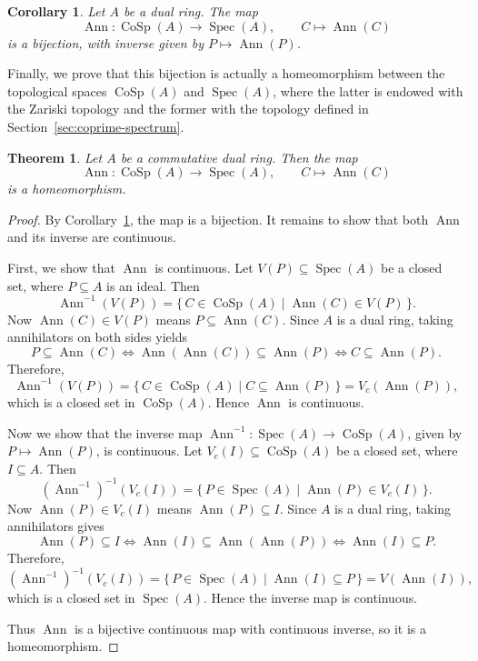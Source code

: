 \documentclass{amsart}
\newtheorem{theorem}{Theorem}
\newtheorem{corollary}{Corollary}
\DeclareMathOperator{\ann}{Ann}
\begin{document}
\begin{corollary}\label{cor:dual-coprime-prime-bijection}
Let $A$ be a dual ring. The map
\[
\ann\colon \operatorname{CoSp}(A) \longrightarrow \operatorname{Spec}(A), \qquad C \longmapsto \ann(C)
\]
is a bijection, with inverse given by $P \mapsto \ann(P)$.
\end{corollary}

Finally, we prove that this bijection is actually a homeomorphism between the topological spaces $\operatorname{CoSp}(A)$ and $\operatorname{Spec}(A)$, where the latter is endowed with the Zariski topology and the former with the topology defined in Section~\ref{sec:coprime-spectrum}.

\begin{theorem}\label{thm:dual-homeomorphism}
Let $A$ be a commutative dual ring. Then the map
\[
\ann\colon \operatorname{CoSp}(A) \longrightarrow \operatorname{Spec}(A), \qquad C \longmapsto \ann(C)
\]
is a homeomorphism.
\end{theorem}

\begin{proof}
By Corollary~\ref{cor:dual-coprime-prime-bijection}, the map is a bijection. It remains to show that both $\ann$ and its inverse are continuous.

First, we show that $\ann$ is continuous. Let $V(P) \subseteq \operatorname{Spec}(A)$ be a closed set, where $P \subseteq A$ is an ideal. Then
\[
\ann^{-1}(V(P)) = \{\, C \in \operatorname{CoSp}(A) \mid \ann(C) \in V(P) \,\}.
\]
Now $\ann(C) \in V(P)$ means $P \subseteq \ann(C)$. Since $A$ is a dual ring, taking annihilators on both sides yields
\[
P \subseteq \ann(C) \iff \ann(\ann(C)) \subseteq \ann(P) \iff C \subseteq \ann(P).
\]
Therefore,
\[
\ann^{-1}(V(P)) = \{\, C \in \operatorname{CoSp}(A) \mid C \subseteq \ann(P) \,\} = V_c(\ann(P)),
\]
which is a closed set in $\operatorname{CoSp}(A)$. Hence $\ann$ is continuous.

Now we show that the inverse map $\ann^{-1}\colon \operatorname{Spec}(A) \to \operatorname{CoSp}(A)$, given by $P \mapsto \ann(P)$, is continuous. Let $V_c(I) \subseteq \operatorname{CoSp}(A)$ be a closed set, where $I \subseteq A$. Then
\[
(\ann^{-1})^{-1}(V_c(I)) = \{\, P \in \operatorname{Spec}(A) \mid \ann(P) \in V_c(I) \,\}.
\]
Now $\ann(P) \in V_c(I)$ means $\ann(P) \subseteq I$. Since $A$ is a dual ring, taking annihilators gives
\[
\ann(P) \subseteq I \iff \ann(I) \subseteq \ann(\ann(P)) \iff \ann(I) \subseteq P.
\]
Therefore,
\[
(\ann^{-1})^{-1}(V_c(I)) = \{\, P \in \operatorname{Spec}(A) \mid \ann(I) \subseteq P \,\} = V(\ann(I)),
\]
which is a closed set in $\operatorname{Spec}(A)$. Hence the inverse map is continuous.

Thus $\ann$ is a bijective continuous map with continuous inverse, so it is a homeomorphism.
\end{proof}
\end{document}
